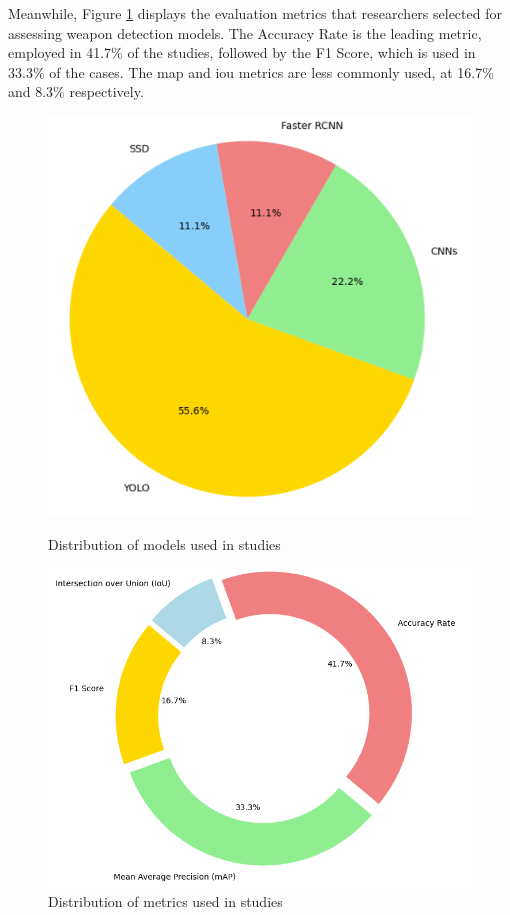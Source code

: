 Meanwhile, Figure \ref{fig:metrics-distribution} displays the evaluation metrics that researchers selected for assessing weapon detection models. The Accuracy Rate is the leading metric, employed in 41.7\% of the studies, followed by the F1 Score, which is used in 33.3\% of the cases. The \ac{map} and \ac{iou} metrics are less commonly used, at 16.7\% and 8.3\% respectively.
\begin{figure}[h]
    \centering

    \begin{minipage}{0.4\textwidth}
        \centering
        \includegraphics[width=\textwidth]{figs/models-distribution.png} %
        \caption{Distribution of models used in studies}
        \label{fig:models-distribution}
    \end{minipage}
    \hfill
    \begin{minipage}{0.5\textwidth}
        \centering
        \includegraphics[width=\textwidth]{figs/metrics-distribution.png} %
        \caption{Distribution of metrics used in studies}
        \label{fig:metrics-distribution}
    \end{minipage}

\end{figure}